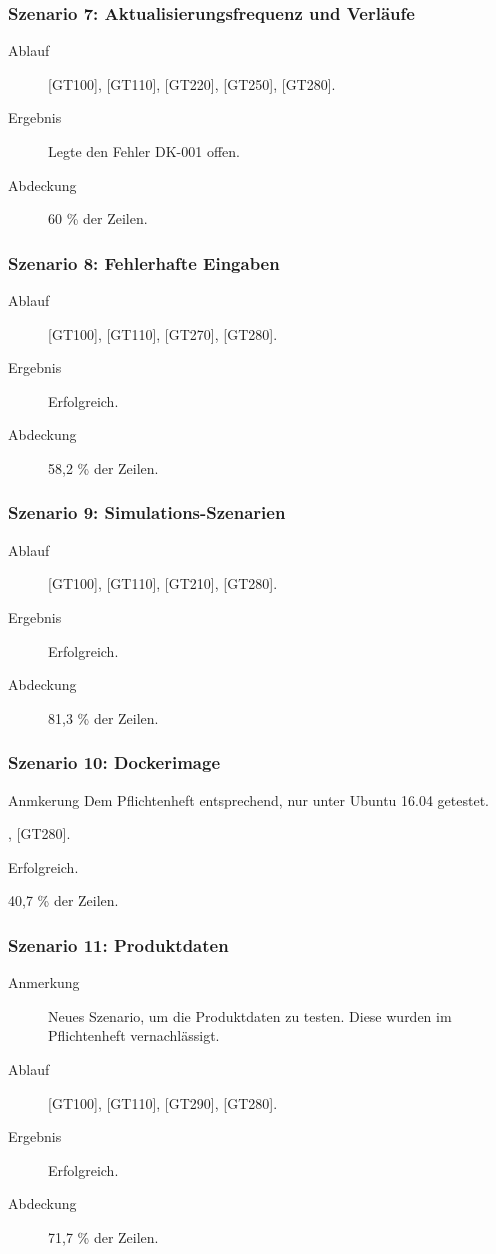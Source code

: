 \documentclass[parskip=full]{scrartcl}
\begin{document}
\subsubsection{Szenario 7: Aktualisierungsfrequenz und Verläufe}
\begin{description}
	\item[Ablauf] [GT100], [GT110], [GT220], [GT250], [GT280].
	\item[Ergebnis] Legte den Fehler DK-001 offen.
	\item[Abdeckung] 60 \% der Zeilen.
\end{description}

\subsubsection{Szenario 8: Fehlerhafte Eingaben}
\begin{description}
	\item[Ablauf] [GT100], [GT110], [GT270], [GT280].
	\item[Ergebnis] Erfolgreich.
	\item[Abdeckung] 58,2 \% der Zeilen.
\end{description}

\subsubsection{Szenario 9: Simulations-Szenarien}
\begin{description}
	\item[Ablauf] [GT100], [GT110], [GT210], [GT280].
	\item[Ergebnis] Erfolgreich.
	\item[Abdeckung] 81,3 \% der Zeilen.
\end{description}

\subsubsection{Szenario 10: Dockerimage}
\begin{description}
	\item{Anmkerung} Dem Pflichtenheft entsprechend, nur unter Ubuntu 16.04 getestet.
	\item[Ablauf] [GT130], [GT280].
	\item[Ergebnis] Erfolgreich.
	\item[Abdeckung] 40,7 \% der Zeilen.
\end{description}

\subsubsection{Szenario 11: Produktdaten}
\begin{description}
	\item[Anmerkung] Neues Szenario, um die Produktdaten zu testen. Diese wurden im Pflichtenheft vernachlässigt.
	\item[Ablauf] [GT100], [GT110], [GT290], [GT280].
	\item[Ergebnis] Erfolgreich.
	\item[Abdeckung] 71,7 \% der Zeilen.
\end{description}
\end{document}
